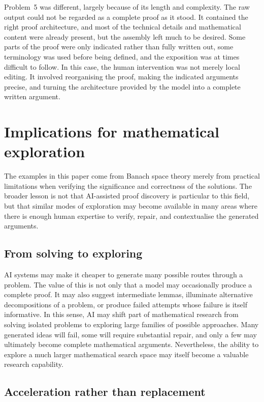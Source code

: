 \documentclass[11pt,reqno]{amsart}
\theoremstyle{plain}
\theoremstyle{definition}
\begin{document}
Problem~5 was different, largely because of its length and complexity. The raw output could not be regarded as a complete proof as it stood. It contained the right proof architecture, and most of the technical details and mathematical content were already present, but the assembly left much to be desired. Some parts of the proof were only indicated rather than fully written out, some terminology was used before being defined, and the exposition was at times difficult to follow. In this case, the human intervention was not merely local editing. It involved reorganising the proof, making the indicated arguments precise, and turning the architecture provided by the model into a complete written argument.
\section{Implications for mathematical exploration}
\label{sec:new-age}

The examples in this paper come from Banach space theory merely from practical limitations when verifying the significance and correctness of the solutions. The broader lesson is not that AI-assisted proof discovery is particular to this field, but that similar modes of exploration may become available in many areas where there is enough human expertise to verify, repair, and contextualise the generated arguments.

\subsection{From solving to exploring}

AI systems may make it cheaper to generate many possible routes through a problem. The value of this is not only that a model may occasionally produce a complete proof. It may also suggest intermediate lemmas, illuminate alternative decompositions of a problem, or produce failed attempts whose failure is itself informative. In this sense, AI may shift part of mathematical research from solving isolated problems to exploring large families of possible approaches. Many generated ideas will fail, some will require substantial repair, and only a few may ultimately become complete mathematical arguments. Nevertheless, the ability to explore a much larger mathematical search space may itself become a valuable research capability.

\subsection{Acceleration rather than replacement}
\end{document}
